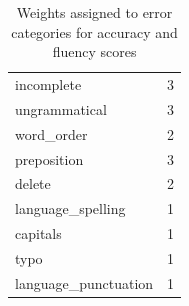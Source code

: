 \begin{table}[H]
\begin{tabular}{lr}
		\hspace{3em}incomplete            & 3    \\
		\hspace{3em}ungrammatical         & 3   \\
		\hspace{3em}word\_order           & 2   \\
		\hspace{3em}preposition           & 3    \\
		\hspace{3em}delete                & 2   \\
		\hspace{1em}language\_spelling    & 1   \\
		\hspace{3em}capitals              & 1   \\
		\hspace{3em}typo                  & 1   \\
		\hspace{1em}language\_punctuation & 1   \\
		\bottomrule
	\end{tabular}
	\caption{\label{tab:errweights}Weights assigned to error categories for accuracy and fluency scores}
\end{table}
